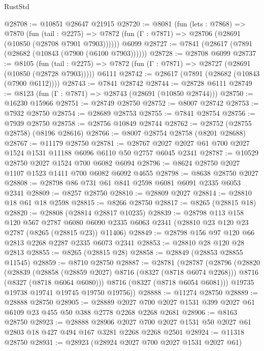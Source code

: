 \begin{lexlean}{RustStd}
\begin{coremodule}
{\begin{coremodule}
{{{{{{{{{{{{{{{{{{{{{{{{{{{{{{{{{{{{{{{{{{{{{{{{{{{{{{@28708 := @10851 @28647 @21915
@28720 := @8081
    (fun (lets : @7868) =>
    @7870
      (fun (tail : @2275) =>
      @7872 (fun (Γ : @7871) => @28706 (@28691 (@10850 (@28708 @7901 @7903))))))
    @6099
@28727 := @7841 (@28617 (@7891 (@28682 (@10843 (@7900 (@6100 @7903))))))
@28728 := @28708 @6099
@28737 := @8105
    (fun (tail : @2275) => @7872 (fun (Γ : @7871) => @28727 (@28691 (@10850 (@28728 @7903)))))
    @6111
@28742 := @28617 (@7891 (@28682 (@10843 (@7900 @6112))))
@28743 := @7841 @28742
@28744 := @28728 @6111
@28749 := @8123 (fun (Γ : @7871) => @28743 (@28691 (@10850 @28744)))
@28750 := @16230 @15966
@28751 := @28749 @28750
@28752 := @8007 @28742
@28753 := @7932 @28750
@28754 := @28689 @28753
@28755 := @7841 @28754
@28756 := @7939 @28750
@28758 := @28756 @10849 @28744
@28762 := @28752 (@28755 @28758) (@8196 @28616)
@28766 := @8007 @28754 @28758 (@8201 @28688)
@28767 := @11179 @28750
@28781 := @28767 @2027 @2027 @61 @700 @2027 @1524 @1531 @11188 @6096 @6110 @50 @2757 @6045 @2341
@28787 := @10529 @28750 @2027 @1524 @700 @6082 @6094
@28796 := @8624 @28750 @2027 @1107 @1523 @1411 @700 @6082 @6092 @4655
@28798 := @8638 @28750 @2027
@28808 := @28798 @86 @731 @61 @841 @2598 @6081 @6091 @2335 @6053 @2341
@28809 := @8257 @28750
@28810 := @28809 @2027
@28814 := @28810 @18 @61 @18 @2598
@28815 := @8266 @28750
@28817 := @8265 (@28815 @18)
@28820 := @28808 (@28814 @28817 @10235)
@28839 := @28798
    @113
    @158
    @120
    @567
    @2787
    @6080
    @6090
    @2335
    @6063
    @2341
    (@28810 @23 @120 @23 @2787 (@8265 (@28815 @23)) @11406)
@28849 := @28798 @156 @97 @120 @66 @2813 @2268 @2287 @2335 @6073 @2341
@28853 := @28810 @28 @120 @28 @2813
@28855 := @8265 (@28815 @28)
@28858 := @28849 (@28853 @28855 @11545)
@28859 := @8710 @28750
@28887 := @28781
    (@28787
      (@28796
        (@28820
          (@28839
            (@28858 (@28859 @2027) @8716 (@8327 (@8718 @6074 @2268)))
            @8716
            (@8327 (@8718 @6064 @6080)))
          @8716
          (@8327 (@8718 @6054 @6081)))
        @19735
        @19738
        @19741
        @19745
        @19750
        @19756))
@28888 := @11274 @28750
@28889 := @28888 @28750
@28905 := @28889
    @2027
    @700
    @2027
    @1531
    @399
    @2027
    @61
    @6109
    @23
    @455
    @50
    @388
    @2778
    @2268
    @2268
    @2681
@28906 := @8163 @28750
@28923 := @28888
    @28906
    @2027
    @700
    @2027
    @1531
    @50
    @2027
    @61
    @2803
    @18
    @427
    @494
    @167
    @3281
    @2268
    @2268
    @2501
@28924 := @11318 @28750
@28931 := @28923 (@28924 @2027 @700 @2027 @1531 @2027 @61)
}}}}}}}}}}}}}}}}}}}}}}}}}}}}}}}}}}}}}}}}}}}}}}}}}}}}}}
\end{coremodule}}
\end{coremodule}
\end{lexlean}
